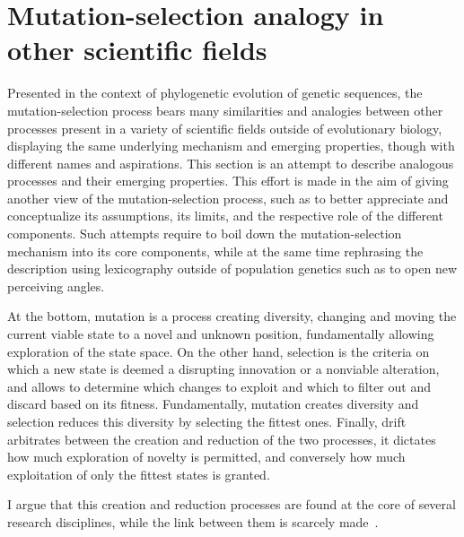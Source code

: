 \section{Mutation-selection analogy in other scientific fields}

Presented in the context of phylogenetic evolution of genetic sequences, the mutation-selection process bears many similarities and analogies between other processes present in a variety of scientific fields outside of evolutionary biology, displaying the same underlying mechanism and emerging properties, though with different names and aspirations.
This section is an attempt to describe analogous processes and their emerging properties.
This effort is made in the aim of giving another view of the mutation-selection process, such as to better appreciate and conceptualize its assumptions, its limits, and the respective role of the different components.
Such attempts require to boil down the mutation-selection mechanism into its core components, while at the same time rephrasing the description using lexicography outside of population genetics such as to open new perceiving angles.

At the bottom, mutation is a process creating diversity, changing and moving the current viable state to a novel and unknown position, fundamentally allowing exploration of the state space.
On the other hand, selection is the criteria on which a new state is deemed a disrupting innovation or a nonviable alteration, and allows to determine which changes to exploit and which to filter out and discard based on its fitness.
Fundamentally, mutation creates diversity and selection reduces this diversity by selecting the fittest ones.
Finally, drift arbitrates between the creation and reduction of the two processes, it dictates how much exploration of novelty is permitted, and conversely how much exploitation of only the fittest states is granted.

I argue that this creation and reduction processes are found at the core of several research disciplines, while the link between them is scarcely made~\citep{Baeck1994, Eiben1998}.

